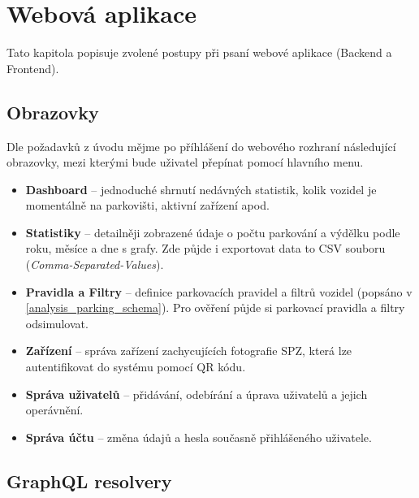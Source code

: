 
\chapter{Webová aplikace}

Tato kapitola popisuje zvolené postupy při psaní webové aplikace (Backend a Frontend).

\section{Obrazovky}

Dle požadavků z úvodu mějme po příhlášení do webového rozhraní následující obrazovky, mezi kterými bude uživatel přepínat pomocí hlavního menu.

\begin{itemize}
  \item \textbf{Dashboard} -- jednoduché shrnutí nedávných statistik, kolik vozidel je
        momentálně na parkovišti, aktivní zařízení apod.
  \item \textbf{Statistiky} -- detailněji zobrazené údaje o počtu parkování a výdělku podle roku, měsíce a dne s grafy.
        Zde půjde i exportovat data to CSV souboru (\textit{Comma-Separated-Values}).
  \item \textbf{Pravidla a Filtry} -- definice parkovacích pravidel a filtrů vozidel (popsáno v \ref{analysis_parking_schema}).
        Pro ověření půjde si parkovací pravidla a filtry odsimulovat.
  \item \textbf{Zařízení} -- správa zařízení zachycujících fotografie SPZ, která lze autentifikovat do systému pomocí
        QR kódu.
  \item \textbf{Správa uživatelů} -- přidávání, odebírání a úprava uživatelů a jejich operávnění.
  \item \textbf{Správa účtu} -- změna údajů a hesla současně přihlášeného uživatele.
\end{itemize}

\section{GraphQL resolvery}

